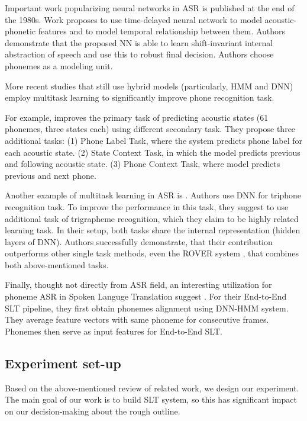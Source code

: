Important work popularizing neural networks in ASR is  published at the end of the 1980s. Work proposes to use time-delayed neural network to model acoustic-phonetic features and to model temporal relationship between them. Authors demonstrate that the proposed NN is able to learn shift-invariant internal abstraction of speech and use this to robust final decision. Authors choose phonemes as a modeling unit.

More recent studies that still use hybrid models (particularly, HMM and DNN) employ multitask learning to significantly improve phone recognition task. 

For example,  improves the primary task of predicting acoustic states (61 phonemes, three states each) using different secondary task. They propose three additional tasks: (1) Phone Label Task, where the system predicts phone label for each acoustic state. (2) State Context Task, in which the model predicts previous and following acoustic state. (3) Phone Context Task, where model predicts previous and next phone.

Another example of multitask learning in ASR is . Authors use DNN for triphone recognition task. To improve the performance in this task, they suggest to use additional task of trigrapheme recognition, which they claim to be highly related learning task. In their setup, both tasks share the internal representation (hidden layers of DNN). Authors successfully demonstrate, that their contribution outperforms other single task methods, even the ROVER system , that combines both above-mentioned tasks.

Finally, thought not directly from ASR field, an interesting utilization for phoneme ASR in Spoken Languge Translation suggest . For their End-to-End SLT pipeline, they first obtain phonemes alignment using DNN-HMM system. They average feature vectors with same phoneme for consecutive frames. Phonemes then serve as input features for End-to-End SLT. 

\subsection{Experiment set-up}
\label{asr:phon:experiment}
Based on the above-mentioned review of related work, we design our experiment. The main goal of our work is to build SLT system, so this has significant impact on our decision-making about the rough outline.

